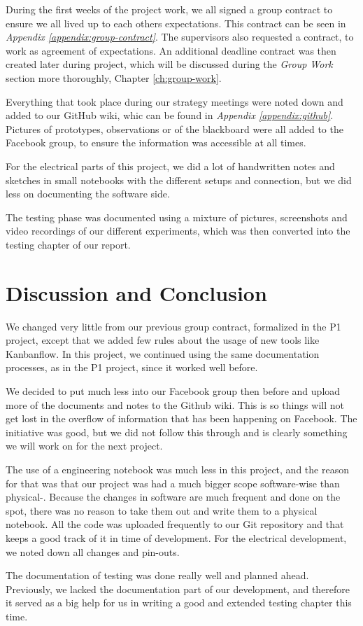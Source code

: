 During the first weeks of the project work, we all signed a group contract to ensure we all lived up to each others expectations. This contract can be seen in \textit{Appendix \ref{appendix:group-contract}}. The supervisors also requested a contract, to work as agreement of expectations. An additional deadline contract was then created later during project, which will be discussed during the \textit{Group Work} section more thoroughly, Chapter \ref{ch:group-work}.

Everything that took place during our strategy meetings were noted down and added to our GitHub wiki, whic can be found in \textit{Appendix \ref{appendix:github}}. Pictures of prototypes, observations or of the blackboard were all added to the Facebook group, to ensure the information was accessible at all times.

For the electrical parts of this project, we did a lot of handwritten notes and sketches in small notebooks with the different setups and connection, but we did less on documenting the software side.

The testing phase was documented using a mixture of pictures, screenshots and video recordings of our different experiments, which was then converted into the testing chapter of our report. 

\section{Discussion and Conclusion}

We changed very little from our previous group contract, formalized in the P1 project, except that we added few rules about the usage of new tools like Kanbanflow. In this project, we continued using the same documentation processes, as in the P1 project, since it worked well before. 

We decided to put much less into our Facebook group then before and upload more of the documents and notes to the Github wiki. This is so things will not get lost in the overflow of information that has been happening on Facebook. The initiative was good, but we did not follow this through and is clearly something we will work on for the next project.

The use of a engineering notebook was much less in this project, and the reason for that was that our project was had a much bigger scope software-wise than physical-. Because the changes in software are much frequent and done on the spot, there was no reason to take them out and write them to a physical notebook. All the code was uploaded frequently to our Git repository and that keeps a good track of it in time of development. For the electrical development, we noted down all changes and pin-outs.

The documentation of testing was done really well and planned ahead. Previously, we lacked the documentation part of our development, and therefore it served as a big help for us in writing a good and extended testing chapter this time.